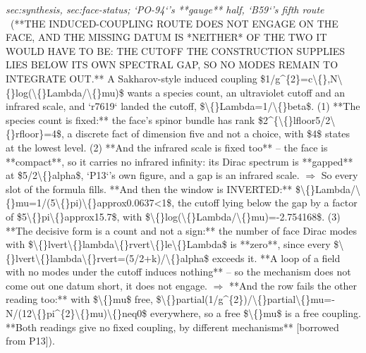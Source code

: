 \begin{description}
\textit{sec:synthesis, sec:face-status; `PO-94`'s **gauge** half, `B59`'s fifth route} \ (**THE INDUCED-COUPLING ROUTE DOES NOT ENGAGE ON THE FACE, AND THE MISSING DATUM IS *NEITHER* OF THE TWO IT WOULD HAVE TO BE: THE CUTOFF THE CONSTRUCTION SUPPLIES LIES BELOW ITS OWN SPECTRAL GAP, SO NO MODES REMAIN TO INTEGRATE OUT.** A Sakharov-style induced coupling \$1/g\textasciicircum{}\{2\}=c\textbackslash\{\},N\textbackslash\{\}log(\textbackslash\{\}Lambda/\textbackslash\{\}mu)\$ wants a species count, an ultraviolet cutoff and an infrared scale, and `r7619` landed the cutoff, \$\textbackslash\{\}Lambda=1/\textbackslash\{\}beta\$. (1) **The species count is fixed:** the face's spinor bundle has rank \$2\textasciicircum{}\{\textbackslash\{\}lfloor5/2\textbackslash\{\}rfloor\}=4\$, a discrete fact of dimension five and not a choice, with \$4\$ states at the lowest level. (2) **And the infrared scale is fixed too** -- the face is **compact**, so it carries no infrared infinity: its Dirac spectrum is **gapped** at \$5/2\textbackslash\{\}alpha\$, `P13`'s own figure, and a gap is an infrared scale. \ensuremath{\Rightarrow} So every slot of the formula fills.  **And then the window is INVERTED:** \$\textbackslash\{\}Lambda/\textbackslash\{\}mu=1/(5\textbackslash\{\}pi)\textbackslash\{\}approx0.0637<1\$, the cutoff lying below the gap by a factor of \$5\textbackslash\{\}pi\textbackslash\{\}approx15.7\$, with \$\textbackslash\{\}log(\textbackslash\{\}Lambda/\textbackslash\{\}mu)=-2.754168\$. (3) **The decisive form is a count and not a sign:** the number of face Dirac modes with \$\textbackslash\{\}lvert\textbackslash\{\}lambda\textbackslash\{\}rvert\textbackslash\{\}le\textbackslash\{\}Lambda\$ is **zero**, since every \$\textbackslash\{\}lvert\textbackslash\{\}lambda\textbackslash\{\}rvert=(5/2+k)/\textbackslash\{\}alpha\$ exceeds it. **A loop of a field with no modes under the cutoff induces nothing** -- so the mechanism does not come out one datum short, it does not engage. \ensuremath{\Rightarrow} **And the row fails the other reading too:** with \$\textbackslash\{\}mu\$ free, \$\textbackslash\{\}partial(1/g\textasciicircum{}\{2\})/\textbackslash\{\}partial\textbackslash\{\}mu=-N/(12\textbackslash\{\}pi\textasciicircum{}\{2\}\textbackslash\{\}mu)\textbackslash\{\}neq0\$ everywhere, so a free \$\textbackslash\{\}mu\$ is a free coupling. **Both readings give no fixed coupling, by different mechanisms** [borrowed from P13]). 

\end{description}
